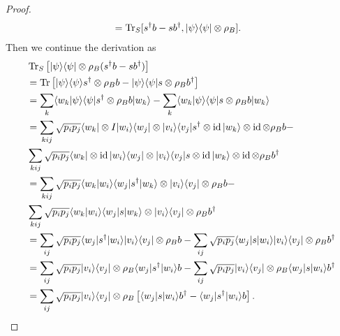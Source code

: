 \documentclass[../../note.tex]{subfiles}
\begin{document}
\begin{proof}
\begin{align}
        &= \operatorname{Tr}_S[s^\dagger b -s b^\dagger, \vert \psi \rangle \langle \psi \vert \otimes \rho_B].
    \end{align}
    Then we continue the derivation as
    \begin{align}
        &\tr_S\left[\vert \psi \rangle \langle \psi \vert \otimes \rho_B (s^\dagger b - s b^\dagger)\right]\\
        &= \tr\left[\vert \psi \rangle \langle \psi \rangle s^\dagger \otimes \rho_B b - \vert \psi \rangle \langle \psi \vert s \otimes \rho_B b^\dagger \right] \\
        &= \sum_k \langle w_k \vert \psi \rangle \langle \psi \vert s^\dagger \otimes \rho_B b \vert w_k \rangle - \sum_k \langle w_k \vert \psi \rangle \langle \psi \vert s \otimes \rho_B b \vert w_k \rangle \\
        &= \sum_{kij} \sqrt{p_i p_j} \langle w_k \vert \otimes I \vert w_i \rangle \langle w_j \vert \otimes \vert v_i \rangle \langle v_j \vert s^\dagger \otimes \id \vert w_k \rangle \otimes \id \otimes \rho_B b - \\
        &\sum_{kij} \sqrt{p_i p_j} \langle w_k \vert \otimes \id \vert w_i \rangle \langle w_j \vert \otimes \vert v_i \rangle \langle v_j \vert s \otimes \id \vert w_k \rangle \otimes \id \otimes \rho_B b^\dagger \\
        &= \sum_{kij} \sqrt{p_i p_j} \langle w_k \vert w_i \rangle \langle w_j \vert s^\dagger \vert w_k \rangle \otimes \vert v_i \rangle \langle v_j \vert \otimes \rho_B b - \\
        &\sum_{kij} \sqrt{p_i p_j} \langle w_k \vert w_i \rangle \langle w_j \vert s \vert w_k \rangle \otimes \vert v_i \rangle \langle v_j \vert \otimes  \rho_B b^\dagger \\
        &= \sum_{ij} \sqrt{p_i p_j} \langle w_j \vert s^\dagger \vert w_i \rangle \vert v_i \rangle \langle v_j \vert \otimes \rho_B b -
        \sum_{ij} \sqrt{p_i p_j} \langle w_j \vert s \vert w_i \rangle \vert v_i \rangle \langle v_j \vert \otimes  \rho_B b^\dagger \\
        &= \sum_{ij} \sqrt{p_i p_j} \vert v_i \rangle \langle v_j \vert \otimes \rho_B \langle w_j \vert s^\dagger \vert w_i \rangle b -
        \sum_{ij} \sqrt{p_i p_j}  \vert v_i \rangle \langle v_j \vert \otimes  \rho_B \langle w_j \vert s \vert w_i \rangle b^\dagger \\
        &= \sum_{ij} \sqrt{p_i p_j} \vert v_i \rangle \langle v_j \vert \otimes \rho_B \left[\langle w_j \vert s \vert w_i \rangle b^\dagger - \langle w_j \vert s^\dagger \vert w_i \rangle b \right].

\end{align}
\end{proof}
\end{document}
